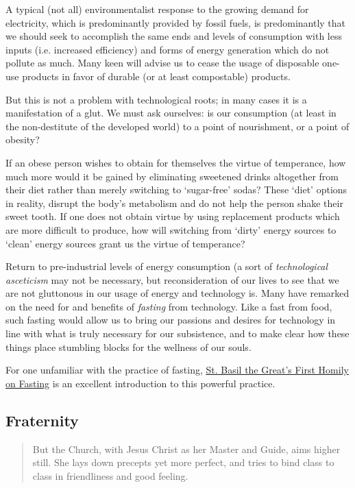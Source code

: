 \documentclass[letterpaper]{article}
\begin{document}
A typical (not all) environmentalist response to the growing demand for electricity, which is predominantly provided by fossil fuels, is predominantly that we should seek to accomplish the same ends and levels of consumption with less inputs (i.e. increased efficiency) and forms of energy generation which do not pollute as much. Many keen will advise us to cease the usage of disposable one-use products in favor of durable (or at least compostable) products.

But this is not a problem with technological roots; in many cases it is a manifestation of a glut. We must ask ourselves: is our consumption (at least in the non-destitute of the developed world) to a point of nourishment, or a point of obesity?

If an obese person wishes to obtain for themselves the virtue of temperance, how much more would it be gained by eliminating sweetened drinks altogether from their diet rather than merely switching to `sugar-free' sodas? These `diet' options in reality, disrupt the body's metabolism and do not help the person shake their sweet tooth. If one does not obtain virtue by using replacement products which are more difficult to produce, how will switching from `dirty' energy sources to `clean' energy sources grant us the virtue of temperance?

Return to pre-industrial levels of energy consumption (a sort of \textit{technological asceticism} may not be necessary, but reconsideration of our lives to see that we are not gluttonous in our usage of energy and technology is. Many have remarked on the need for and benefits of \textit{fasting} from technology. Like a fast from food, such fasting would allow us to bring our passions and desires for technology in line with what is truly necessary for our subsistence, and to make clear how these things place stumbling blocks for the wellness of our souls. 

For one unfamiliar with the practice of fasting, \href{http://rutgersnb.occministries.org/wp-content/uploads/2015/07/St.-Basil-the-Great%E2%80%99s-First-Homily-on-Fasting.pdf}{St. Basil the Great's First Homily on Fasting} is an excellent introduction to this powerful practice. 

\subsection{Fraternity}

\begin{quote}
  But the Church, with Jesus Christ as her Master and Guide, aims higher still. She lays down precepts yet more perfect, and tries to bind class to class in friendliness and good feeling.
\end{quote}
\end{document}
